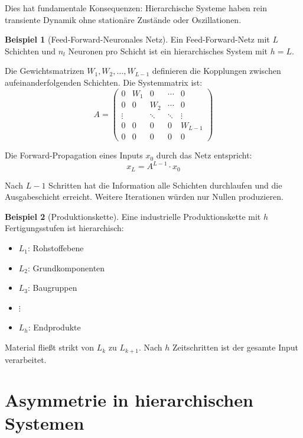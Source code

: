 ﻿\documentclass[a4paper,12pt]{report}
\theoremstyle{definition}
\newtheorem{beispiel}{Beispiel}
\begin{document}
	Dies hat fundamentale Konsequenzen: Hierarchische Systeme haben rein transiente Dynamik ohne stationäre Zustände oder Oszillationen.
	
	\begin{beispiel}[Feed-Forward-Neuronales Netz]
		Ein Feed-Forward-Netz mit $L$ Schichten und $n_l$ Neuronen pro Schicht ist ein hierarchisches System mit $h = L$.
		
		Die Gewichtsmatrizen $W_1, W_2, \ldots, W_{L-1}$ definieren die Kopplungen zwischen aufeinanderfolgenden Schichten. Die Systemmatrix ist:
		\[
		A = \begin{pmatrix}
			0 & W_1 & 0 & \cdots & 0 \\
			0 & 0 & W_2 & \cdots & 0 \\
			\vdots & & \ddots & \ddots & \vdots \\
			0 & 0 & 0 & 0 & W_{L-1} \\
			0 & 0 & 0 & 0 & 0
		\end{pmatrix}
		\]
		
		Die Forward-Propagation eines Inputs $x_0$ durch das Netz entspricht:
		\[
		x_L = A^{L-1} \cdot x_0
		\]
		
		Nach $L-1$ Schritten hat die Information alle Schichten durchlaufen und die Ausgabeschicht erreicht. Weitere Iterationen würden nur Nullen produzieren.
	\end{beispiel}
	
	\begin{beispiel}[Produktionskette]
		Eine industrielle Produktionskette mit $h$ Fertigungsstufen ist hierarchisch:
		\begin{itemize}
			\item $L_1$: Rohstoffebene
			\item $L_2$: Grundkomponenten
			\item $L_3$: Baugruppen
			\item $\vdots$
			\item $L_h$: Endprodukte
		\end{itemize}
		
		Material fließt strikt von $L_k$ zu $L_{k+1}$. Nach $h$ Zeitschritten ist der gesamte Input verarbeitet.
	\end{beispiel}
	
	\section{Asymmetrie in hierarchischen Systemen}
	
\end{document}
